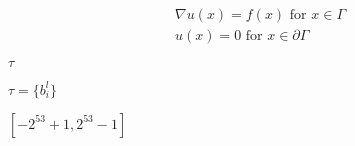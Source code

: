 \documentclass{article}
\begin{document}
\begin{eqnarray*} \nabla u(x) = f(x) \text{ for } x \in \Gamma \\ u(x)=0 \text{ for } x \in \partial\Gamma \end{eqnarray*}
\pagebreak

$ \tau $
\pagebreak

$\tau =\{b_i^l\}$
\pagebreak

$[-2^{53}+1, 2^{53}-1]$
\pagebreak
\end{document}
